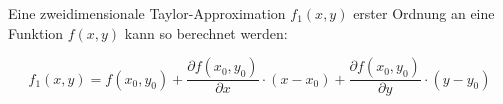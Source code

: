 Eine zweidimensionale Taylor-Approximation $f_1(x, y)$ erster Ordnung an eine Funktion $f(x, y)$ kann so berechnet werden:

$$ f_1(x, y) = f(x_0, y_0) + \frac{\partial f(x_0, y_0)}{\partial x}\cdot(x - x_0) + \frac{\partial f(x_0, y_0)}{\partial y} \cdot(y - y_0) $$
